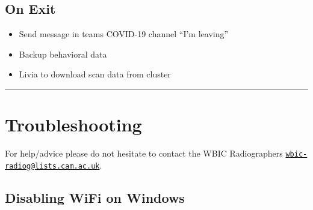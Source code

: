 \documentclass[
]{book}
\providecommand{\tightlist}{%
  \setlength{\itemsep}{0pt}\setlength{\parskip}{0pt}}
\begin{document}
\hypertarget{on-exit}{%
\subsection{On Exit}\label{on-exit}}

\begin{itemize}
\tightlist
\item
  Send message in teams COVID-19 channel ``I'm leaving''
\item
  Backup behavioral data
\item
  Livia to download scan data from cluster
\end{itemize}

\begin{center}\rule{0.5\linewidth}{0.5pt}\end{center}

\hypertarget{troubleshooting}{%
\section{Troubleshooting}\label{troubleshooting}}

For help/advice please do not hesitate to contact the WBIC Radiographers \href{mailto:wbic-radiog@lists.cam.ac.uk}{\nolinkurl{wbic-radiog@lists.cam.ac.uk}}.

\hypertarget{disabling-wifi-on-windows}{%
\subsection{Disabling WiFi on Windows}\label{disabling-wifi-on-windows}}
\end{document}
